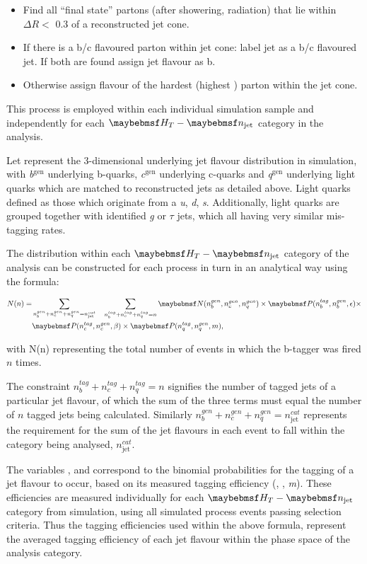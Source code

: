 \begin{itemize}
\item Find all ``final state'' partons (after showering, radiation) that lie within $\Delta R <$ 0.3 of a reconstructed jet cone.
\item If there is a b/c flavoured parton within jet cone: label jet as a b/c flavoured jet. If both are found assign jet flavour as b.
\item Otherwise assign flavour of the hardest (highest \pt) parton within the jet cone.
\end{itemize}

This process is employed within each individual simulation sample and independently for each $\theht-\njet$ category in the analysis. 

Let \nbcq represent the 3-dimensional underlying jet flavour distribution in simulation, with \textit{b}$^{\text{gen}}$ underlying b-quarks, \textit{c}$^{\text{gen}}$ underlying c-quarks and \textit{q}$^{\text{gen}}$ underlying light quarks which are matched to reconstructed jets as detailed above. Light quarks defined as those which originate from a \textit{u}, \textit{d}, \textit{s}. Additionally, light quarks are grouped together with identified \textit{g} or $\tau$ jets, which all having very similar mis-tagging rates.  

The \nbreco distribution within each $\theht-\njet$ category of the analysis can be constructed for each process in turn in an analytical way using the formula:

\begin{align}
\label{eq:btagformula}
N(n) =& \sum_{n_{b}^{gen}+n_{c}^{gen}+n_{q}^{gen} = n_{\text{jet}}^{cat}} \quad \sum_{n_{b}^{tag}+n_{c}^{tag}+n_{q}^{tag} = n} \nbcq \times \probb \times \nonumber \\
& \probc \times \probl,
\end{align}

with N(n) representing the total number of events in which the b-tagger was fired $n$ times. 

The constraint $n_{b}^{tag}+n_{c}^{tag}+n_{q}^{tag} = n$ signifies the number of tagged jets of a particular jet flavour, of which the sum of the three terms must equal the number of $n$ tagged jets being calculated. Similarly $n_{b}^{gen}+n_{c}^{gen}+n_{q}^{gen} = n_{\text{jet}}^{cat}$ represents the requirement for the sum of the jet flavours in each event to fall within the \njet category being analysed, $n_{\text{jet}}^{cat}$.

The variables \probb, \probc and \probl correspond to the binomial probabilities for the tagging of a jet flavour to occur, based on its measured tagging efficiency (\eff, \ceff, \textit{m}). These efficiencies are measured individually for each $\theht-\njet$ category from simulation, using all simulated process events passing selection criteria. Thus the tagging efficiencies used within the above formula, represent the averaged tagging efficiency of each jet flavour within the phase space of the analysis category.

